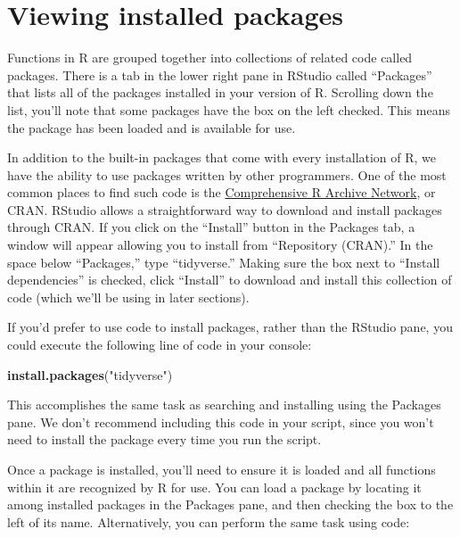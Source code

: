 \documentclass[]{Nemilov}
\newenvironment{Shaded}{\begin{snugshade}}{\end{snugshade}}
\newcommand{\KeywordTok}[1]{\textcolor[rgb]{0.13,0.29,0.53}{\textbf{#1}}}
\newcommand{\NormalTok}[1]{#1}
\newcommand{\StringTok}[1]{\textcolor[rgb]{0.31,0.60,0.02}{#1}}
\begin{document}
\hypertarget{r-viewing-installed-packages}{%
\section{Viewing installed packages}\label{r-viewing-installed-packages}}

Functions in R are grouped together into collections of related code called
packages. There is a tab in the lower right pane in RStudio called ``Packages''
that lists all of the packages installed in your version of R.
Scrolling down the list, you'll note that some packages have the box on the
left checked. This means the package has been loaded and is available for use.

In addition to the built-in packages that come with every installation of R,
we have the ability to use packages written by other programmers.
One of the most common places to find such code is the
\href{https://cran.r-project.org}{Comprehensive R Archive Network}, or CRAN.
RStudio allows a straightforward way to download and install packages
through CRAN. If you click on the ``Install'' button in the Packages tab,
a window will appear allowing you to install from ``Repository (CRAN).''
In the space below ``Packages,'' type ``tidyverse.'' Making sure the box next to
``Install dependencies'' is checked, click ``Install'' to download and install
this collection of code (which we'll be using in later sections).

If you'd prefer to use code to install packages, rather than the RStudio pane,
you could execute the following line of code in your console:

\begin{Shaded}
\begin{Highlighting}[]
\KeywordTok{install.packages}\NormalTok{(}\StringTok{"tidyverse"}\NormalTok{)}
\end{Highlighting}
\end{Shaded}

This accomplishes the same task as searching and installing using the Packages pane.
We don't recommend including this code in your script, since you won't need to
install the package every time you run the script.

Once a package is installed, you'll need to ensure it is loaded and all functions
within it are recognized by R for use. You can load a package by locating it among
installed packages in the Packages pane, and then checking the box to the left of its
name. Alternatively, you can perform the same task using code:
\end{document}
